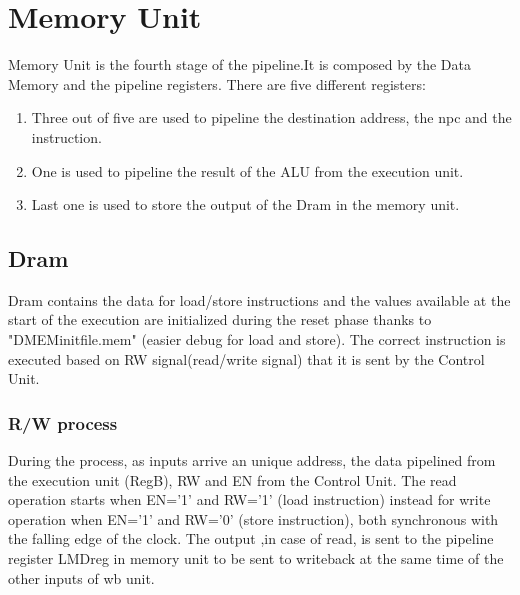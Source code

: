 \chapter{Memory Unit}
\label{Memory Unit}
Memory Unit is the fourth stage of the pipeline.It is composed by the Data Memory and the pipeline registers. There are five different registers:
\begin{enumerate} 
    \item Three out of five are used to pipeline the destination address, the npc and the instruction.
    \item One is used to pipeline the result of the ALU from the execution unit.
    \item Last one is used to store the output of the Dram in the memory unit.
\end{enumerate} 
\section{Dram}
Dram contains the data for load/store instructions and the values available at the start of the execution are initialized during the reset phase thanks to "DMEMinitfile.mem" (easier debug for load and store).
The correct instruction is executed based on RW signal(read/write signal) that it is sent by the Control Unit.
\subsection{R/W process}
During the process,  as inputs arrive an unique address, the data pipelined from the execution unit (RegB), RW and EN from the Control Unit. The read operation starts 
when EN='1' and RW='1' (load instruction) instead for write operation when EN='1' and RW='0' (store instruction), both synchronous with the falling edge of the clock.
The output ,in case of read, is sent to the pipeline register LMDreg in memory unit to be sent to writeback at the same time of the other inputs of wb unit.